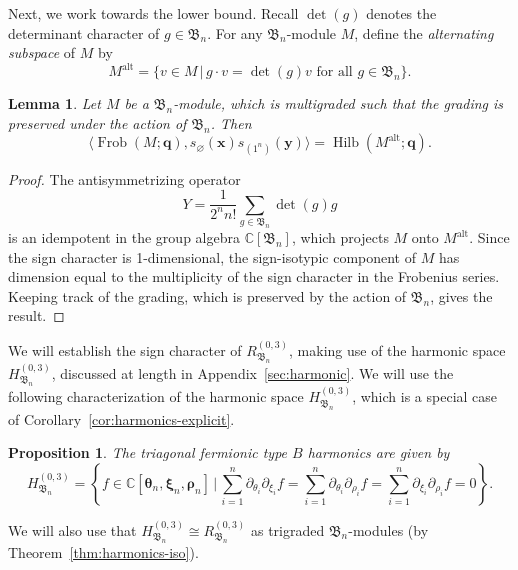 \documentclass[12pt]{amsart}
\theoremstyle{plain}
\newtheorem{proposition}[theorem]{Proposition}
\newtheorem{lemma}[theorem]{Lemma}
\theoremstyle{definition}
\DeclareMathOperator{\Frob}{Frob}
\DeclareMathOperator{\Hilb}{Hilb}
\DeclareMathOperator{\alt}{alt}
\newcommand{\C}{\mathbb{C}}
\newcommand{\x}{\mathbf{x}}
\newcommand{\y}{\mathbf{y}}
\begin{document}
Next, we work towards the lower bound.
Recall $\det(g)$ denotes the determinant character of $g \in \mathfrak{B}_n$.
For any $\mathfrak{B}_n$-module $M$, define the \emph{alternating subspace} of $M$ by
\begin{equation}
    M^{\alt} = \{v \in M \, | \, g \cdot v = \det(g) v \text{ for all } g \in \mathfrak{B}_n \}.
\end{equation}

\begin{lemma}\label{lem:alt}
Let $M$ be a $\mathfrak{B}_n$-module, which is multigraded such that the grading is preserved under the action of $\mathfrak{B}_n$. 
Then
 \begin{equation}
     \langle \Frob(M; \mathbf{q}) , s_{\varnothing}(\x) s_{(1^n)}(\y) \rangle = \Hilb(M^{\alt};  \mathbf{q}).
 \end{equation}
\end{lemma}

\begin{proof}
    The antisymmetrizing operator
    \begin{equation}
        Y = \frac{1}{2^n n!}\sum_{g \in \mathfrak{B}_n} \det(g) g
    \end{equation}
    is an idempotent in the group algebra $\C[\mathfrak{B}_n]$, which projects $M$ onto $M^{\alt}$. 
    Since the sign character is 1-dimensional, the sign-isotypic component of $M$ has dimension equal to the multiplicity of the sign character in the Frobenius series. 
    Keeping track of the grading, which is preserved by the action of $\mathfrak{B}_n$, gives the result.
\end{proof}

We will establish the sign character of $R_{\mathfrak{B}_n}^{(0,3)}$, making use of the harmonic space $H_{\mathfrak{B}_n}^{(0,3)}$, discussed at length in Appendix~\ref{sec:harmonic}. 
We will use the following characterization of the harmonic space $H_{\mathfrak{B}_n}^{(0,3)}$, which is a special case of Corollary~\ref{cor:harmonics-explicit}.
\begin{proposition}\label{prop:B03-harmonics}
The \emph{triagonal fermionic type $B$ harmonics} are given by
\begin{equation}\label{eq:simplified-harmonics} 
H_{\mathfrak{B}_n}^{(0,3)} = \left\{ f \in \C[\bm{\theta}_n, \bm{\xi}_n, \bm{\rho}_n]\, \Bigg| \, \sum_{i=1}^n \partial_{\theta_i}\partial_{\xi_i} f = \sum_{i=1}^n \partial_{\theta_i}\partial_{\rho_i} f= \sum_{i=1}^n \partial_{\xi_i}\partial_{\rho_i} f =0\right\}.
\end{equation}
\end{proposition}
We will also use that $H_{\mathfrak{B}_n}^{(0,3)} \cong R_{\mathfrak{B}_n}^{(0,3)}$ as trigraded $\mathfrak{B}_n$-modules (by Theorem~\ref{thm:harmonics-iso}).
\end{document}
